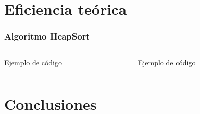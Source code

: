 \documentclass[8pt, aspectratio=169]{beamer}
\begin{document}
    \section{Eficiencia teórica}

    \begin{frame}[fragile]
        \frametitle{Algoritmo HeapSort}
   
        
        

        \begin{columns}
			\begin{column}{0.5\textwidth}
				\begin{exampleblock}{Ejemplo de código}
                     
                \end{exampleblock}
			\end{column}
			\begin{column}{0.5\textwidth}

				\begin{exampleblock}{Ejemplo de código}
                     
                \end{exampleblock}

				

			\end{column}
			\end{columns}
    \end{frame}

    \section{Conclusiones}
\end{document}
